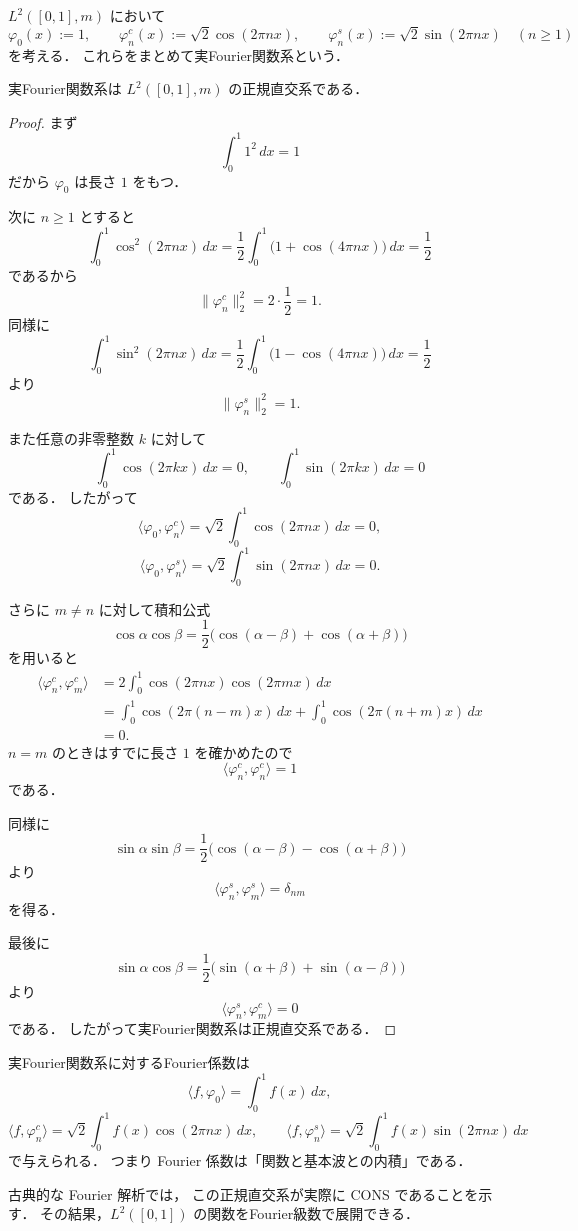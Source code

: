 \begin{definition}[実Fourier関数系]
$L^2([0,1],m)$ において
\[
\varphi_0(x):=1,
\qquad
\varphi_n^c(x):=\sqrt{2}\cos(2\pi n x),
\qquad
\varphi_n^s(x):=\sqrt{2}\sin(2\pi n x)
\quad (n\ge 1)
\]
を考える．
これらをまとめて実Fourier関数系という．
\end{definition}

\begin{proposition}
実Fourier関数系は $L^2([0,1],m)$ の正規直交系である．
\end{proposition}
\begin{proof}
まず
\[
\int_0^1 1^2\,dx=1
\]
だから $\varphi_0$ は長さ $1$ をもつ．

次に $n\ge 1$ とすると
\[
\int_0^1 \cos^2(2\pi n x)\,dx
=
\frac12\int_0^1 \bigl(1+\cos(4\pi n x)\bigr)\,dx
=
\frac12
\]
であるから
\[
\|\varphi_n^c\|_2^2=2\cdot \frac12=1.
\]
同様に
\[
\int_0^1 \sin^2(2\pi n x)\,dx
=
\frac12\int_0^1 \bigl(1-\cos(4\pi n x)\bigr)\,dx
=
\frac12
\]
より
\[
\|\varphi_n^s\|_2^2=1.
\]

また任意の非零整数 $k$ に対して
\[
\int_0^1 \cos(2\pi kx)\,dx=0,
\qquad
\int_0^1 \sin(2\pi kx)\,dx=0
\]
である．
したがって
\[
\langle \varphi_0,\varphi_n^c\rangle
=
\sqrt{2}\int_0^1 \cos(2\pi n x)\,dx
=0,
\]
\[
\langle \varphi_0,\varphi_n^s\rangle
=
\sqrt{2}\int_0^1 \sin(2\pi n x)\,dx
=0.
\]

さらに $m\ne n$ に対して積和公式
\[
\cos \alpha \cos \beta
=
\frac12\bigl(\cos(\alpha-\beta)+\cos(\alpha+\beta)\bigr)
\]
を用いると
\begin{align*}
\langle \varphi_n^c,\varphi_m^c\rangle
&=
2\int_0^1 \cos(2\pi n x)\cos(2\pi m x)\,dx \\
&=
\int_0^1 \cos(2\pi(n-m)x)\,dx
+
\int_0^1 \cos(2\pi(n+m)x)\,dx \\
&=0.
\end{align*}
$n=m$ のときはすでに長さ $1$ を確かめたので
\[
\langle \varphi_n^c,\varphi_n^c\rangle=1
\]
である．

同様に
\[
\sin \alpha \sin \beta
=
\frac12\bigl(\cos(\alpha-\beta)-\cos(\alpha+\beta)\bigr)
\]
より
\[
\langle \varphi_n^s,\varphi_m^s\rangle
=
\delta_{nm}
\]
を得る．

最後に
\[
\sin \alpha \cos \beta
=
\frac12\bigl(\sin(\alpha+\beta)+\sin(\alpha-\beta)\bigr)
\]
より
\[
\langle \varphi_n^s,\varphi_m^c\rangle=0
\]
である．
したがって実Fourier関数系は正規直交系である．
\end{proof}

\begin{remark}
実Fourier関数系に対するFourier係数は
\[
\langle f,\varphi_0\rangle=\int_0^1 f(x)\,dx,
\]
\[
\langle f,\varphi_n^c\rangle
=
\sqrt{2}\int_0^1 f(x)\cos(2\pi n x)\,dx,
\qquad
\langle f,\varphi_n^s\rangle
=
\sqrt{2}\int_0^1 f(x)\sin(2\pi n x)\,dx
\]
で与えられる．
つまり Fourier 係数は「関数と基本波との内積」である．

古典的な Fourier 解析では，
この正規直交系が実際に CONS であることを示す．
その結果，$L^2([0,1])$ の関数をFourier級数で展開できる．
\end{remark}

